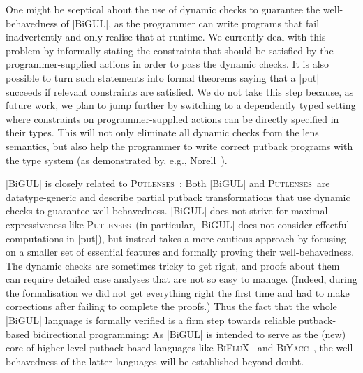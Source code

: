 \documentclass{sigplanconf}
\newcommand{\Putlenses}{\textsc{Putlenses}}
\newcommand{\BiFluX}{\textsc{BiFluX}}
\newcommand{\Agda}{\textsc{Agda}}
\newcommand{\BiYacc}{\textsc{BiYacc}}
\begin{document}
One might be sceptical about the use of dynamic checks to guarantee the well-behavedness of |BiGUL|, as the programmer can write programs that fail inadvertently and only realise that at runtime.
We currently deal with this problem by informally stating the constraints that should be satisfied by the programmer-supplied actions in order to pass the dynamic checks.
It is also possible to turn such statements into formal theorems saying that a |put| succeeds if relevant constraints are satisfied.
We do not take this step because, as future work, we plan to jump further by switching to a dependently typed setting where constraints on programmer-supplied actions can be directly specified in their types. This will not only eliminate all dynamic checks from the lens semantics, but also help the programmer to write correct putback programs with the type system (as demonstrated by, e.g., Norell~\cite{Norell-interactive-programming}).

|BiGUL| is closely related to \Putlenses~\cite{Pacheco-putlenses}:
Both |BiGUL| and \Putlenses\ are datatype-generic and describe partial putback transformations that use dynamic checks to guarantee well-behavedness.
|BiGUL| does not strive for maximal expressiveness like \Putlenses\ (in particular, |BiGUL| does not consider effectful computations in |put|), but instead takes a more cautious approach by focusing on a smaller set of essential features and formally proving their well-behavedness.
The dynamic checks are sometimes tricky to get right, and proofs about them can require detailed case analyses that are not so easy to manage.
(Indeed, during the formalisation we did not get everything right the first time and had to make corrections after failing to complete the proofs.)
Thus the fact that the whole |BiGUL| language is formally verified is a firm step towards reliable putback-based bidirectional programming: As |BiGUL| is intended to serve as the (new) core of higher-level putback-based languages like \BiFluX~\cite{Pacheco-BiFluX} and \BiYacc~\cite{Zhu-BiYacc}, the well-behavedness of the latter languages will be established beyond doubt.
\end{document}
